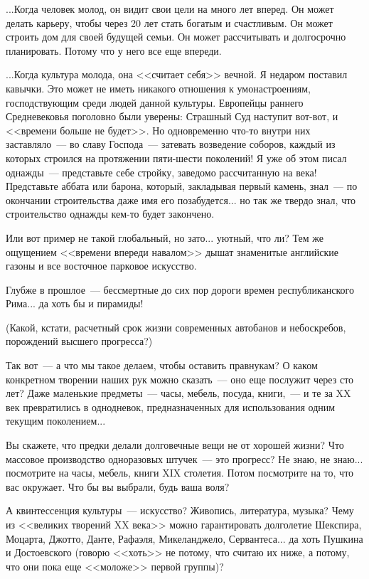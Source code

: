 \documentclass{scrbook}
\newcommand{\flqq}{<<}
\newcommand{\frqq}{>>}
\newcommand{\mdash}{~--- }
\newcommand{\commamdash}{~--- } %
\begin{document}
...Когда человек молод, он видит свои цели на много лет вперед. Он может делать карьеру, чтобы через 20 лет стать богатым и счастливым. Он может строить дом для своей будущей семьи. Он может рассчитывать и долгосрочно планировать. Потому что у него все еще впереди.

...Когда культура молода, она {\flqq}считает себя{\frqq} вечной. Я недаром поставил кавычки. Это может не иметь никакого отношения к умонастроениям, господствующим среди людей данной культуры. Европейцы раннего Средневековья поголовно были уверены: Страшный Суд наступит вот-вот, и {\flqq}времени больше не будет{\frqq}. Но одновременно что-то внутри них заставляло{\mdash}во славу Господа{\mdash}затевать возведение соборов, каждый из которых строился на протяжении пяти-шести поколений! Я уже об этом писал однажды{\mdash}представьте себе стройку, заведомо рассчитанную на века! Представьте аббата или барона, который, закладывая первый камень, знал{\mdash}по окончании строительства даже имя его позабудется... но так же твердо знал, что строительство однажды кем-то будет закончено.

Или вот пример не такой глобальный, но зато... уютный, что ли? Тем же ощущением {\flqq}времени впереди навалом{\frqq} дышат знаменитые английские газоны и все восточное парковое искусство.

Глубже в прошлое{\mdash}бессмертные до сих пор дороги времен республиканского Рима... да хоть бы и пирамиды!

(Какой, кстати, расчетный срок жизни современных автобанов и небоскребов, порождений высшего прогресса?)

Так вот{\mdash}а что мы такое делаем, чтобы оставить правнукам? О каком конкретном творении наших рук можно сказать{\mdash}оно еще послужит через сто лет? Даже маленькие предметы{\mdash}часы, мебель, посуда, книги,{\commamdash}и те за XX век превратились в однодневок, предназначенных для использования одним текущим поколением...

Вы скажете, что предки делали долговечные вещи не от хорошей жизни? Что массовое производство одноразовых штучек{\mdash}это прогресс? Не знаю, не знаю... посмотрите на часы, мебель, книги XIX столетия. Потом посмотрите на то, что вас окружает. Что бы вы выбрали, будь ваша воля?

А квинтессенция культуры{\mdash}искусство? Живопись, литература, музыка? Чему из {\flqq}великих творений XX века{\frqq} можно гарантировать долголетие Шекспира, Моцарта, Джотто, Данте, Рафаэля, Микеланджело, Сервантеса... да хоть Пушкина и Достоевского (говорю {\flqq}хоть{\frqq} не потому, что считаю их ниже, а потому, что они пока еще {\flqq}моложе{\frqq} первой группы)?
\end{document}
